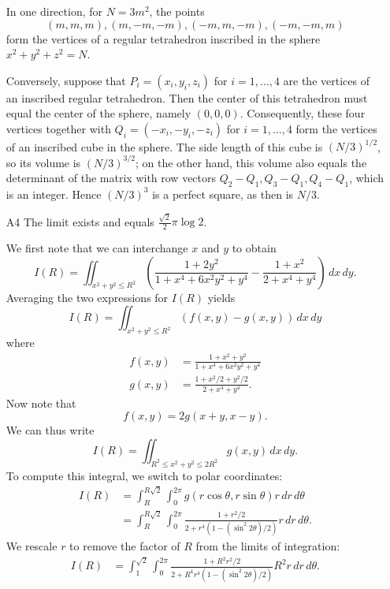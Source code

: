 \documentclass[amssymb,twocolumn,pra,10pt,aps]{revtex4-1}
\begin{document}
\begin{itemize}
In one direction, for $N = 3m^2$, the points
\[
(m,m,m), (m,-m,-m), (-m,m,-m), (-m,-m,m)
\]
form the vertices of a regular tetrahedron inscribed in the sphere $x^2 + y^2 + z^2 = N$.

Conversely, suppose that $P_i = (x_i, y_i, z_i)$ for $i=1,\dots,4$ are the vertices of an inscribed regular 
tetrahedron. Then the center of this tetrahedron must equal the center of the sphere, namely $(0,0,0)$. Consequently, these four vertices together with $Q_i = (-x_i, -y_i, -z_i)$ for $i=1,\dots,4$ form the vertices of an inscribed cube in the sphere.
The side length of this cube is $(N/3)^{1/2}$, so its volume is $(N/3)^{3/2}$;
on the other hand, this volume also equals the determinant of the matrix
with row vectors $Q_2-Q_1, Q_3-Q_1, Q_4-Q_1$, which is an integer. Hence $(N/3)^3$ is a perfect square, as then is $N/3$.

\item[A4]
The limit exists and equals $\frac{\sqrt{2}}{2} \pi \log 2$.

We first note that we can interchange $x$ and $y$ to obtain
\[
I(R) = \iint_{x^2+y^2 \leq R^2} \left( \frac{1+2y^2}{1+x^4+6x^2y^2+y^4} - \frac{1+x^2}{2+x^4+y^4} \right)\,dx\,dy.
\]
Averaging the two expressions for $I(R)$ yields
\[
I(R) = \iint_{x^2+y^2 \leq R^2} (f(x,y) - g(x,y))\,dx\,dy
\]
where
\begin{align*}
f(x,y) &= \frac{1+x^2+y^2}{1 + x^4 + 6x^2y^2 + y^4} \\
g(x,y) &= \frac{1+x^2/2+y^2/2}{2 + x^4 + y^4}.
\end{align*}
Now note that
\[f(x,y) = 2 g(x+y, x-y).
\]
We can thus write
\[
I(R) = \iint_{R^2 \leq x^2 +y^2 \leq 2R^2} g(x,y)\,dx\,dy.
\]
To compute this integral, we switch to polar coordinates:
\begin{align*}
I(R) &= \int_R^{R\sqrt{2}} \int_0^{2\pi} g(r\cos \theta, r \sin \theta)r\,dr\,d\theta \\
&=  \int_R^{R\sqrt{2}} \int_0^{2\pi} \frac{1 + r^2/2}{2 + r^4(1 - (\sin^2 2\theta)/2)} r\,dr\,d\theta.
\end{align*}
We rescale $r$ to remove the factor of $R$ from the limits of integration:
\begin{align*}
I(R) & =  \int_1^{\sqrt{2}} \int_0^{2\pi} \frac{1 + R^2 r^2/2}{2 + R^4 r^4(1 - (\sin^2 2\theta)/2)} R^2 r\,dr\,d\theta.
\end{align*}


\end{itemize}
\end{document}

